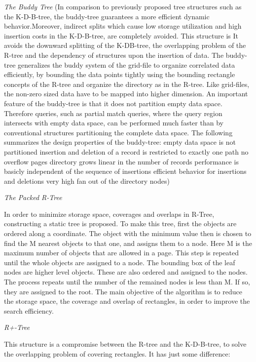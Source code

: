 \documentclass[a4paper,12pt]{article}
\begin{document}
\emph{The Buddy Tree}
(In comparison to previously proposed tree structures such as the K-D-B-tree, the buddy-tree guarantees a more efficient dynamic behavior.Moreover, indirect splits which cause low storage utilization and high insertion costs in the K-D-B-tree, are completely avoided. This structure is 
It avoids the downward splitting of the K-DB-tree, the overlapping problem of the R-tree and the dependency of structures upon the insertion of data. The buddy-tree generalizes the buddy system of the grid-file to organize correlated data efficiently, by bounding the data points tightly using the bounding rectangle concepts of the R-tree and organize the directory as in the R-tree. Like grid-files, the non-zero sized data have to be mapped into higher dimension.
An important feature of the buddy-tree is that it does not partition empty data space. Therefore queries, such as partial match queries, where the query region intersects with empty data space, can be performed much faster than by conventional structures partitioning the complete data space.
The following summarizes the design properties of the buddy-tree:
empty data space is not partitioned
insertion and deletion of a record is restricted to
exactly one path
no overflow pages
directory grows linear in the number of records
performance is basicly independent of the sequence of
insertions
efficient behavior for insertions and deletions
very high fan out of the directory nodes)

\emph{The Packed R-Tree}

In order to minimize storage space, coverages and overlaps in R-Tree, constructing a static tree is proposed. To make this tree, first the objects are ordered along a coordinate. The object with the minimum value then is chosen to find the M nearest objects to that one, and assigns them to a node. Here M is the maximum number of objects that are allowed in a page. This step is repeated until the whole objects are assigned to a node. The bounding box of the leaf nodes are higher level objects. These are also ordered and assigned to the nodes. The process repeats until the number of the remained nodes is less than M. If so, they are assigned to the root.
The main objective of the algorithm is to reduce the storage space, the coverage and overlap of rectangles, in order to improve the search efficiency.

\emph{R+-Tree}

This structure is a compromise between the R-tree and the K-D-B-tree, to solve the overlapping problem of covering rectangles. It has just some difference:
\end{document}
